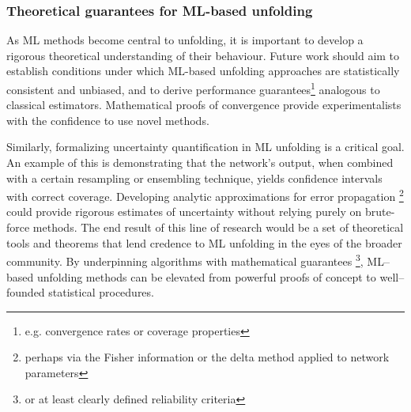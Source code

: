              \subsubsection{Theoretical guarantees for ML-based unfolding}
                As ML methods become central to unfolding, it is important to develop a rigorous theoretical understanding of their behaviour.
                Future work should aim to establish conditions under which ML-based unfolding approaches are statistically consistent and unbiased, and to derive performance guarantees\footnote{e.g. convergence rates or coverage properties} analogous to classical estimators.
                Mathematical proofs of convergence provide experimentalists with the confidence to use novel methods.
                
                Similarly, formalizing uncertainty quantification in ML unfolding is a critical goal.
                An example of this is demonstrating that the network's output, when combined with a certain resampling or ensembling technique, yields confidence intervals with correct coverage.
                Developing analytic approximations for error propagation \footnote{perhaps via the Fisher information or the delta method applied to network parameters} could provide rigorous estimates of uncertainty without relying purely on brute-force methods.
                The end result of this line of research would be a set of theoretical tools and theorems that lend credence to ML unfolding in the eyes of the broader community.
                By underpinning algorithms with mathematical guarantees \footnote{or at least clearly defined reliability criteria}, ML--based unfolding methods can be elevated from powerful proofs of concept to well--founded statistical procedures.

